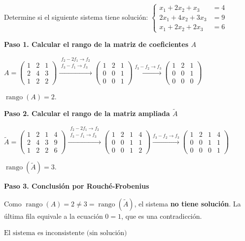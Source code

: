 \begin{example}
Determine si el siguiente sistema tiene solución:
$\begin{cases}
x_1 + 2x_2 + x_3 &= 4\\
2x_1 + 4x_2 + 3x_3 &= 9\\
x_1 + 2x_2 + 2x_3 &= 6
\end{cases}$
\begin{myproof}
\textbf{Paso 1. Calcular el rango de la matriz de coeficientes $A$}

$A = \begin{pmatrix}
1 & 2 & 1\\
2 & 4 & 3\\
1 & 2 & 2
\end{pmatrix} \xrightarrow{\begin{array}{c}f_2 - 2f_1 \to f_2\\ f_3 - f_1 \to f_3\end{array}} \begin{pmatrix}
1 & 2 & 1\\
0 & 0 & 1\\
0 & 0 & 1
\end{pmatrix} \xrightarrow{f_3 - f_2 \to f_3} \begin{pmatrix}
1 & 2 & 1\\
0 & 0 & 1\\
0 & 0 & 0
\end{pmatrix}$

$\operatorname{rango}(A) = 2$.

\textbf{Paso 2. Calcular el rango de la matriz ampliada $\tilde{A}$}

$\tilde{A} = \begin{pmatrix}
1 & 2 & 1 & 4\\
2 & 4 & 3 & 9\\
1 & 2 & 2 & 6
\end{pmatrix} \xrightarrow{\begin{array}{c}f_2 - 2f_1 \to f_2\\ f_3 - f_1 \to f_3\end{array}} \begin{pmatrix}
1 & 2 & 1 & 4\\
0 & 0 & 1 & 1\\
0 & 0 & 1 & 2
\end{pmatrix} \xrightarrow{f_3 - f_2 \to f_3} \begin{pmatrix}
1 & 2 & 1 & 4\\
0 & 0 & 1 & 1\\
0 & 0 & 0 & 1
\end{pmatrix}$

$\operatorname{rango}(\tilde{A}) = 3$.

\textbf{Paso 3. Conclusión por Rouché-Frobenius}

Como $\operatorname{rango}(A) = 2 \neq 3 = \operatorname{rango}(\tilde{A})$, el sistema \textbf{no tiene solución}. La última fila equivale a la ecuación $0 = 1$, que es una contradicción.

$\boxed{\text{El sistema es inconsistente (sin solución)}}$
\end{myproof}
\end{example}

